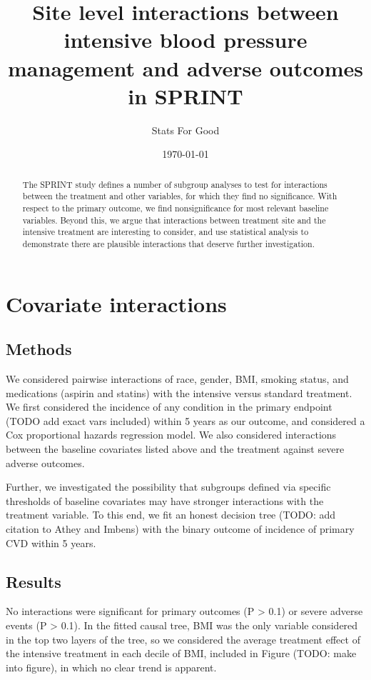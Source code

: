 \documentclass[10pt]{article}
\title{\vspace{-2em}Site level interactions between intensive blood pressure management and
  adverse outcomes in SPRINT}
\author{Stats For Good}
\date{\today}
\begin{document}
 \maketitle

\begin{abstract}
  The SPRINT study defines a number of subgroup analyses to test for
  interactions between the treatment and other variables, for which they find no
  significance. With respect to the primary outcome, we find nonsignificance
  for most relevant baseline variables. Beyond this, we argue that interactions
  between treatment site and the intensive treatment are interesting to
  consider, and use statistical analysis to demonstrate there are plausible
  interactions that deserve further investigation. 
\end{abstract}

\section{Covariate interactions}
\subsection{Methods}
We considered pairwise interactions of race, gender, BMI, smoking status, and
medications (aspirin and statins) with the intensive versus standard
treatment. We first considered the incidence of any condition in the
primary endpoint (TODO add exact vars included) within 5 years as our outcome,
and considered a Cox proportional hazards regression model. We also considered
interactions between the baseline covariates listed above and the treatment
against severe adverse outcomes.

Further, we investigated the possibility that subgroups defined via specific
thresholds of baseline covariates may have stronger interactions with the
treatment variable. To this end, we fit an honest decision tree (TODO: add
citation to Athey and Imbens) with the binary outcome of incidence of primary
CVD within 5 years.

\subsection{Results}
No interactions were significant for primary outcomes (P > 0.1) or severe
adverse events (P > 0.1). In the fitted causal tree, BMI was the only variable
considered in the top two layers of the tree, so we considered the average
treatment effect of the intensive treatment in each decile of BMI, included in
Figure (TODO: make into figure), in which no clear trend is apparent. 
\end{document}

